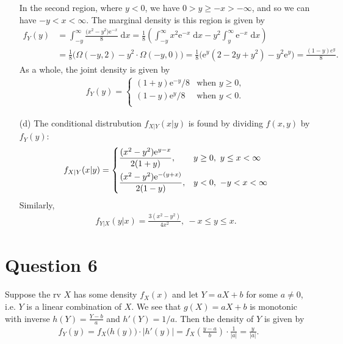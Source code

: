 \documentclass[10pt]{article}
\begin{document}
\begin{itemize}
    In the second region, where \(y < 0\), we have \(0 > y \ge -x > - \infty\), and so we can have \(-y < x < \infty\). 
    The marginal density is this region is given by 
    \begin{align*}
        f_Y(y) &= \int_{-y}^{\infty} \frac{\big( x^2 - y^2 \big) \mathrm{e}^{-x}}{8} \;\mathrm{d}x
        = \frac{1}{8} \left( \int_{-y}^{\infty} x^2 \mathrm{e}^{-x} \;\mathrm{d}x - y^2 \int_y^{\infty} \mathrm{e}^{-x} \;\mathrm{d}x \right) \\
        &= \frac{1}{8} \big( \Omega(-y,2) - y^2 \cdot \Omega(-y,0) \big)
        = \frac{1}{8} \big( \mathrm{e}^{y}(2 - 2y + y^2) - y^2\mathrm{e}^{y} \big)
        = \frac{(1 - y) e^{y}}{8}.
    \end{align*}
    As a whole, the joint density is given by 
    \begin{align*}
        f_Y(y) = \begin{cases}
            (1 + y)\mathrm{e}^{-y} / 8 & \text{when \(y \ge 0\)}, \\
            (1 - y)\mathrm{e}^{y} / 8  & \text{when \(y < 0\)}. \\
        \end{cases}
    \end{align*}
    \item[(d)] The conditional distrubution \(f_{X|Y}(x|y)\) is found by dividing \(f(x,y)\) by \(f_Y(y)\):
    \begin{align*}
        f_{X|Y}(x|y) = \begin{dcases}
            \frac{(x^2 - y^2)\mathrm{e}^{y-x}}{2(1+y)},    & y \ge 0,~  y \le x < \infty \\
            \frac{(x^2 - y^2)\mathrm{e}^{-(y+x)}}{2(1-y)}, & y < 0,~    -y < x < \infty
        \end{dcases}
    \end{align*}
    Similarly, 
    \begin{align*}
        f_{Y|X}(y|x) = \frac{3(x^2 - y^2)}{4x^2}, ~ -x \le y \le x.
    \end{align*}
\end{itemize}

\section{Question 6} \noindent
Suppose the rv \(X\) has some density \(f_X(x)\) and let \(Y = aX + b\) for some \(a \neq 0\), i.e. \(Y\) is a linear combination of \(X\). 
We see that \(g(X) = aX + b\) is monotonic with inverse \(h(Y) = \frac{Y - b}{a}\) and \(h'(Y) = 1/a\). Then the density of \(Y\) is given by 
\begin{align*}
    f_Y(y) = f_X \big( h(y) \big) \cdot \big| h'(y) \big|
    = f_X\left( \frac{y - a}{b} \right) \cdot \frac{1}{|a|} = \frac{y}{|a|}.
\end{align*}
\end{document}
